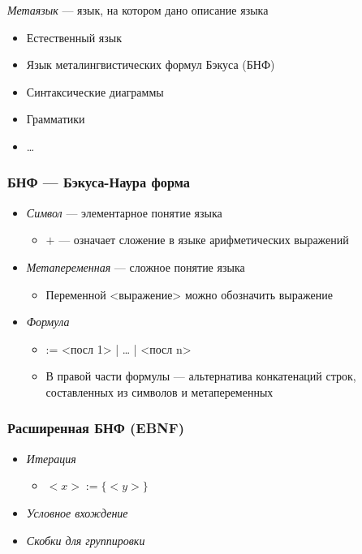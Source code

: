 \documentclass[a4paper, 14pt]{extarticle}
\begin{document}
\textit{Метаязык} --- язык, на котором дано описание языка
\begin{itemize}
    \item Естественный язык
    \item Язык металингвистических формул Бэкуса (БНФ)
    \item Синтаксические диаграммы
    \item Грамматики
    \item \ldots{}
\end{itemize}

\subsubsection{БНФ --- Бэкуса-Наура форма}
\begin{itemize}
    \item \textit{Символ} --- элементарное понятие языка
    \begin{itemize}
        \item $+$ --- означает сложение в языке арифметических выражений
    \end{itemize}
    \item \textit{Метапеременная} --- сложное понятие языка
    \begin{itemize}
        \item Переменной <выражение> можно обозначить выражение
    \end{itemize}
    \item \textit{Формула}
    \begin{itemize}
        \item <определяемый символ> := <посл 1> | \ldots{} | <посл n> %
        \item В правой части формулы --- альтернатива конкатенаций строк, составленных из символов и метапеременных
    \end{itemize}
\end{itemize}

\subsubsection{Расширенная БНФ (EBNF)}
\begin{itemize} %
    \item \textit{Итерация}
    \begin{itemize}
        \item $<x> := \{ <y> \}$
    \end{itemize}
    \item \textit{Условное вхождение}
    \item \textit{Скобки для группировки} 
\end{itemize}
\end{document}
